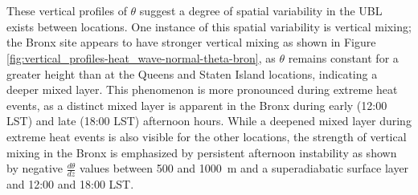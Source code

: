 \documentclass[num-refs]{wiley-article}
\begin{document}
\\ \\
These vertical profiles of $\theta$ suggest a degree of spatial variability in the UBL exists between locations. One instance of this spatial variability is vertical mixing; the Bronx site appears to have stronger vertical mixing as shown in Figure \ref{fig:vertical_profiles-heat_wave-normal-theta-bron}, as $\theta$ remains constant for a greater height than at the Queens and Staten Island locations, indicating a deeper mixed layer. This phenomenon is more pronounced during extreme heat events, as a distinct mixed layer is apparent in the Bronx during early (12:00 LST) and late (18:00 LST) afternoon hours. While a deepened mixed layer during extreme heat events is also visible for the other locations, the strength of vertical mixing in the Bronx is emphasized by persistent afternoon instability as shown by negative $\frac{d\theta}{dz}$ values between 500 and \SI{1000}{\meter} and a superadiabatic surface layer and 12:00 and 18:00 LST.
\end{document}
